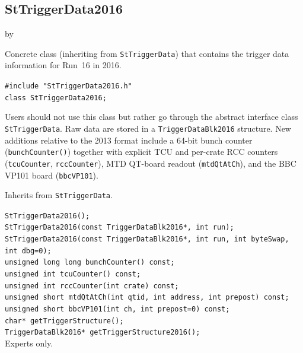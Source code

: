 \documentclass[twoside]{article}
\newcommand{\entrylabel}[1]{\mbox{\textbf{{#1}}}\hfil}%
\newenvironment{entry}
{\begin{list}{}%
    {\renewcommand{\makelabel}{\entrylabel}%
     \setlength{\labelwidth}{90pt}%
     \setlength{\leftmargin}{\labelwidth}
     \advance\leftmargin by \labelsep%
      }%
    }%
  {\end{list}}
\newcommand{\Entrylabel}[1]%
{\raisebox{0pt}[1ex][0pt]{\makebox[\labelwidth][l]%
    {\parbox[t]{\labelwidth}{\hspace{0pt}\textbf{{#1}}}}}}
\newenvironment{Entry}%
{\renewcommand{\entrylabel}{\Entrylabel}\begin{entry}}%
  {\end{entry}}
\begin{document}
\subsection{StTriggerData2016}
\label{sec:StTriggerData2016}
\begin{Entry}
\item[Summary] Concrete class (inheriting from \texttt{StTriggerData}) that
    contains the trigger data information for Run~16 in 2016.
\item[Synopsis]
    \verb+#include "StTriggerData2016.h"+\\
    \verb+class StTriggerData2016;+\\
\item[Description] Users should not use this class but rather go through the
    abstract interface class \texttt{StTriggerData}.  Raw data are stored in a
    \verb+TriggerDataBlk2016+ structure.  New additions relative to the 2013
    format include a 64-bit bunch counter (\verb+bunchCounter()+) together with
    explicit TCU and per-crate RCC counters (\verb+tcuCounter+, \verb+rccCounter+),
    MTD QT-board readout (\verb+mtdQtAtCh+), and the BBC VP101 board
    (\verb+bbcVP101+).
\item[Related Classes] Inherits from \texttt{StTriggerData}.
\item[Public\\ Constructors]
    \verb+StTriggerData2016();+\\
    \verb+StTriggerData2016(const TriggerDataBlk2016*, int run);+\\
    \verb+StTriggerData2016(const TriggerDataBlk2016*, int run, int byteSwap, int dbg=0);+\\
    \verb+unsigned long long bunchCounter() const;+\\
    \verb+unsigned int tcuCounter() const;+\\
    \verb+unsigned int rccCounter(int crate) const;+\\
    \verb+unsigned short mtdQtAtCh(int qtid, int address, int prepost) const;+\\
    \verb+unsigned short bbcVP101(int ch, int prepost=0) const;+\\
    \verb+char* getTriggerStructure();+\\
    \verb+TriggerDataBlk2016* getTriggerStructure2016();+\\
    Experts only.
\end{Entry}
\clearpage
\end{document}
